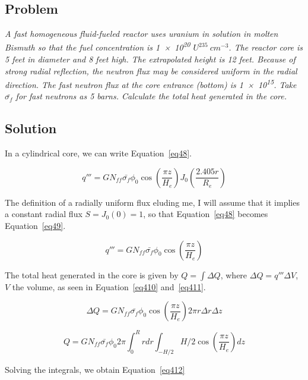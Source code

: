 \subsection{Problem}
\textit{A fast homogeneous fluid-fueled reactor uses uranium in solution in molten Bismuth so that the fuel concentration is \num{1e20} $U^{235}\ cm^{-3}$. The reactor core is 5 feet in diameter and 8 feet high. The extrapolated height is 12 feet. Because of strong radial reflection, the neutron flux may be considered uniform in the radial direction. The fast neutron flux at the core entrance (bottom) is \num{1e15}. Take $\bar{\sigma_f}$ for fast neutrons as 5 barns. Calculate the total heat generated in the core.}

\subsection{Solution}

In a cylindrical core, we can write Equation~\ref{eq48}.

\begin{equation}\label{eq48}
q''' = G N_{ff} \bar{\sigma_{f}} \phi_0 \cos(\frac{\pi z}{H_e}) J_0(\frac{2.405r}{R_e})
\end{equation}

The definition of a radially uniform flux eluding me, I will assume that it implies a constant radial flux $S = J_0(0) = 1$, so that Equation~\ref{eq48} becomes Equation~\ref{eq49}.

\begin{equation}\label{eq49}
q''' = G N_{ff} \bar{\sigma_{f}} \phi_0 \cos(\frac{\pi z}{H_e})
\end{equation}

The total heat generated in the core is given by $Q = \int \Delta Q$, where $\Delta Q = q''' \Delta V$, $V$ the volume, as seen in Equation~\ref{eq410} and~\ref{eq411}.


\begin{equation}\label{eq410}
\Delta Q = G N_{ff} \bar{\sigma_{f}} \phi_0 \cos(\frac{\pi z}{H_e}) 2\pi r\Delta r \Delta z
\end{equation}


\begin{equation}\label{eq411}
Q = G N_{ff} \bar{\sigma_{f}} \phi_0 2\pi \int_0^{R} r dr \int_{-H/2}{H/2} \cos(\frac{\pi z}{H_e}) dz
\end{equation}

Solving the integrals, we obtain Equation~\ref{eq412}

